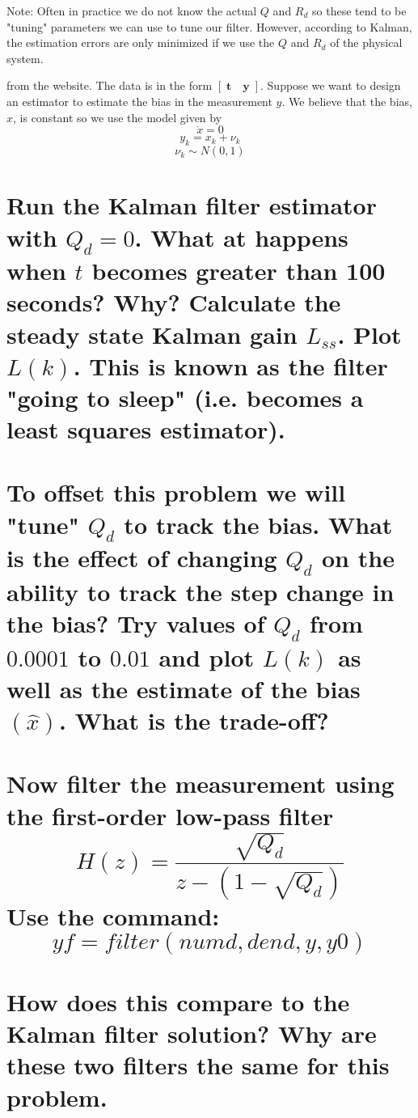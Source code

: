 \documentclass[12pt,letterpaper, onecolumn]{exam}
\begin{document}
\begin{questions}
\begin{parts}
{            Note: Often in practice we do not know the actual $Q$ and $R_d$ so these tend to be "tuning" parameters we can use to tune our filter. However, according to Kalman, the estimation errors are only minimized if we use the $Q$ and $R_d$ of the physical system.}

    \end{parts}
    \clearpage
     from the website. The data is in the form $\left[\;\mathbf{t} \quad \mathbf{y}\;\right]$. Suppose we want to design an estimator to estimate the bias in the measurement $y$. We believe that the bias,$x$, is constant so we use the model given by
    \[\dot{x} = 0\]
    \[y_k = x_k + \nu_k \]
    \[\nu_k \sim N(0,1) \]
    \begin{parts}
        \part{Run the Kalman filter estimator with $Q_d = 0$. What at happens when $t$ becomes greater than 100 seconds? Why? Calculate the steady state Kalman gain $L_{ss}$. Plot $L(k)$. This is known as the filter "going to sleep" (i.e. becomes a least squares estimator). }

        \part{To offset this problem we will "tune" $Q_d$ to track the bias. What is the effect of changing $Q_d$ on the ability to track the step change in the bias? Try values of $Q_d$ from $0.0001$ to $0.01$ and plot $L(k)$ as well as the estimate of the bias $(\hat{x})$. What is the trade-off?}

        \part{Now filter the measurement using the first-order low-pass filter
            \[H(z)=  \frac{\sqrt{Q_d}}{z - \left(1 - \sqrt{Q_d}\right)} \]
            Use the command:
            \[yf = filter(numd,dend,y,y0)\]}

        \part{How does this compare to the Kalman filter solution? Why are these two filters the same for this problem.}
    \end{parts}
    \clearpage
\end{questions}
\end{document}
